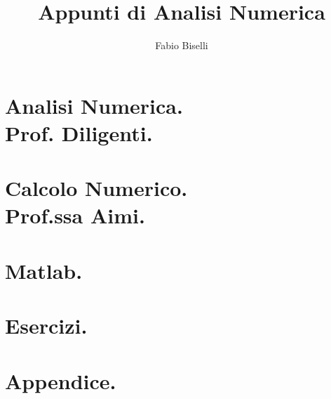 \documentclass[a4paper, 12pt]{report}
\title{Appunti di Analisi Numerica}
\author{Fabio Biselli}
\date {}
\theoremstyle{definition}
\theoremstyle{remark}
\begin{document}
{\samepage
\maketitle
\begin{versionhistory}
\end{versionhistory}
}


\tableofcontents

\part{Analisi Numerica. \\Prof. Diligenti.}
\label{Analisi Numerica.}











\part{Calcolo Numerico. \\Prof.ssa Aimi.}
\label{Calcolo Numerico.}



\part{Matlab.}
\label{Matlab.}

\part{Esercizi.}
\label{Esercizi.}





\part{Appendice.}
\label{Appendici}
\appendix
\label{Appendice}

\end{document}
